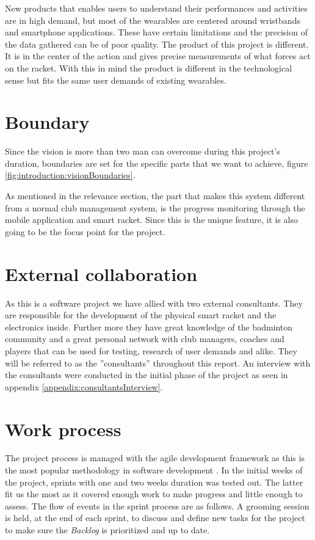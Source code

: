 New products that enables users to understand their performances and activities are in high demand, but most of the wearables are centered around wristbands and smartphone applications.
These have certain limitations and the precision of the data gathered can be of poor quality.
The product of this project is different.
It is in the center of the action and gives precise measurements of what forces act on the racket.
With this in mind the product is different in the technological sense but fits the same user demands of existing wearables.

\section{Boundary}
Since the vision is more than two man can overcome during this project's duration, boundaries are set for the specific parts that we want to achieve, figure \ref{fig:introduction:visionBoundaries}.

As mentioned in the relevance section, the part that makes this system different from a normal club management system, is the progress monitoring through the mobile application and smart racket.
Since this is the unique feature, it is also going to be the focus point for the project.


\section{External collaboration}
\label{sec:externalCollaboration}
As this is a software project we have allied with two external consultants.
They are responsible for the development of the physical smart racket and the electronics inside.
Further more they have great knowledge of the badminton community and a great personal network with club managers, coaches and players that can be used for testing, research of user demands and alike.
They will be referred to as the ''consultants'' throughout this report.
An interview with the consultants were conducted in the initial phase of the project as seen in appendix \ref{appendix:consultantsInterview}.

\section{Work process}
The project process is managed with the agile  development framework as this is the most popular methodology in software development \citep{introduction:work:scrum}. 
In the initial weeks of the project, sprints with one and two weeks duration was tested out.
The latter fit us the most as it covered enough work to make progress and little enough to assess.
The flow of events in the sprint process are as follows.
A grooming session is held, at the end of each sprint, to discuss and define new tasks for the project to make sure the \textit{Backlog} is prioritized and up to date.

